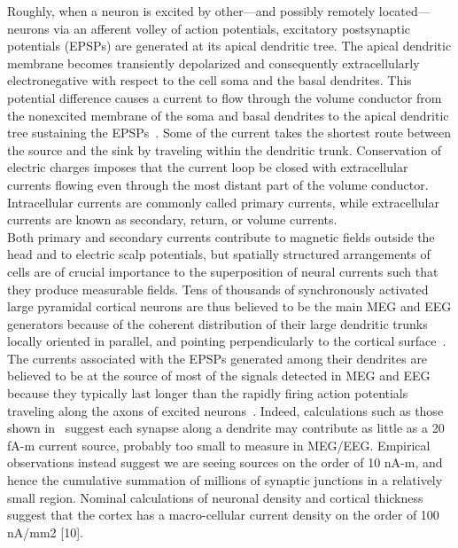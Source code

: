 Roughly, when a neuron is excited by other—and possibly remotely located—neurons via an afferent volley of action potentials, excitatory postsynaptic potentials (EPSPs) are generated at its apical dendritic tree. The apical dendritic membrane becomes transiently depolarized and consequently extracellularly electronegative with respect to the cell soma and the basal dendrites. This potential difference causes a current to flow through the volume conductor from the nonexcited membrane of the soma and basal dendrites to the apical dendritic tree sustaining the EPSPs~\cite{gloor1985neuronal}.
Some of the current takes the shortest route between the source and the sink by traveling within the dendritic trunk. Conservation of electric charges imposes that the current loop be closed with extracellular currents flowing even through the most distant part of the volume conductor. Intracellular currents are commonly called primary currents, while extracellular currents are known as secondary, return, or volume currents.\\

Both primary and secondary currents contribute to magnetic fields outside the head and to electric scalp potentials, but spatially structured arrangements of cells are of crucial importance to the superposition of neural currents such that they produce measurable fields. Tens of thousands of synchronously activated large pyramidal cortical neurons are thus believed to be the main MEG and EEG generators because of the coherent distribution of their large dendritic trunks locally oriented in parallel, and pointing perpendicularly to the cortical surface~\cite{nunez2000relationship}. The currents associated with the EPSPs generated among their dendrites are believed to be at the source of most of the signals detected in MEG and EEG because they typically last longer than the rapidly firing action potentials traveling along the axons of excited neurons~\cite{nunez2006electric}. Indeed, calculations such as those shown in~\cite{hamalainen1993magnetoencephalography} suggest each synapse along a dendrite may
contribute as little as a 20 fA-m current source, probably too small to measure in MEG/EEG. Empirical observations instead suggest we are seeing sources on the order of 10 nA-m, and hence the cumulative summation of millions of synaptic junctions in a relatively small region. Nominal calculations of neuronal density and cortical thickness suggest that the cortex has a macro-cellular current density on the order of 100 nA/mm2 [10].\\

